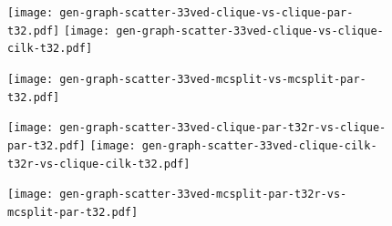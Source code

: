 \documentclass{llncs}
\begin{document}
\begin{figure}[p]
    \texttt{[image: gen-graph-scatter-33ved-clique-vs-clique-par-t32.pdf]}
    \hfill
    \texttt{[image: gen-graph-scatter-33ved-clique-vs-clique-cilk-t32.pdf]}

    \vspace*{1em}

    \texttt{[image: gen-graph-scatter-33ved-mcsplit-vs-mcsplit-par-t32.pdf]}
\end{figure}

\begin{figure}[p]
    \texttt{[image: gen-graph-scatter-33ved-clique-par-t32r-vs-clique-par-t32.pdf]}
    \hfill
    \texttt{[image: gen-graph-scatter-33ved-clique-cilk-t32r-vs-clique-cilk-t32.pdf]}

    \vspace*{1em}

    \texttt{[image: gen-graph-scatter-33ved-mcsplit-par-t32r-vs-mcsplit-par-t32.pdf]}

\end{figure}
\end{document}
